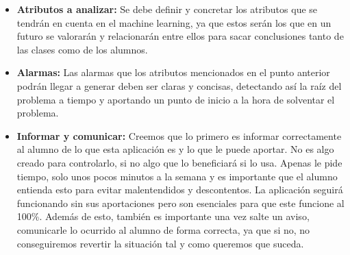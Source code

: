 \begin{itemize}
\item \textbf{Atributos a analizar:} Se debe definir y concretar los atributos que se tendrán en cuenta en el machine learning, ya que estos serán los que en un futuro se valorarán y relacionarán entre ellos para sacar conclusiones tanto de las clases como de los alumnos.

\item \textbf{Alarmas:} Las alarmas que los atributos mencionados en el punto anterior podrán llegar a generar deben ser claras y concisas, detectando así la raíz del problema a tiempo y aportando un punto de inicio a la hora de solventar el problema.

\item \textbf{Informar y comunicar:} Creemos que lo primero es informar correctamente al alumno de lo que esta aplicación es y lo que le puede aportar. No es algo creado para controlarlo, si no algo que lo beneficiará si lo usa. Apenas le pide tiempo, solo unos pocos minutos a la semana y es importante que el alumno entienda esto para evitar malentendidos y descontentos. La aplicación seguirá funcionando sin sus aportaciones pero son esenciales para que este funcione al 100\%. Además de esto, también es importante una vez salte un aviso, comunicarle lo ocurrido al alumno de forma correcta, ya que si no, no conseguiremos revertir la situación tal y como queremos que suceda.

\nocite{marcoPedagogico}\nocite{hezkuntzaEreduArdatzak}\nocite{metodologiaParticipativa}\nocite{aprendizajeBasadoEnProblemas}\nocite{profesorUniversitario}\nocite{modeloUniversitario}
  
\end{itemize}
